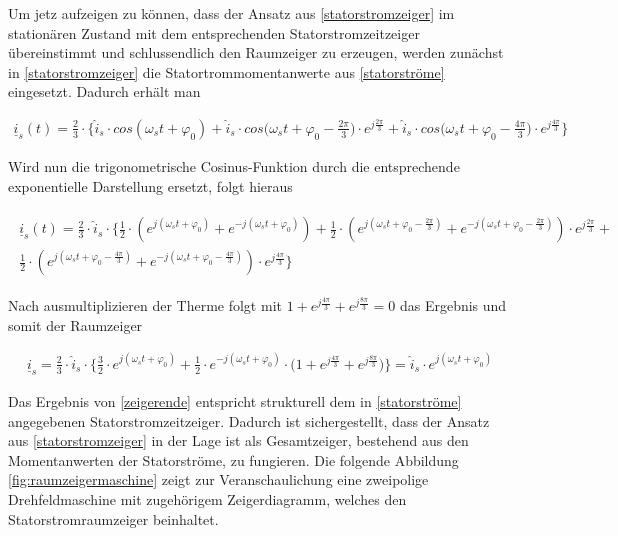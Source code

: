 Um jetz aufzeigen zu können, dass der Ansatz aus \ref{statorstromzeiger} im stationären Zustand mit dem entsprechenden Statorstromzeitzeiger übereinstimmt und schlussendlich den Raumzeiger zu erzeugen, werden zunächst in \ref{statorstromzeiger} die Statortrommomentanwerte aus \ref{statorströme} eingesetzt.
Dadurch erhält man

\begin{align}
\underline{i}_{s}(t) = \frac{2}{3} \cdot \biggl\{\hat{i}_{s}\cdot cos(\omega_{s}t+\varphi_{0}) + \hat{i}_{s}\cdot cos\bigg(\omega_{s}t+\varphi_{0}-\frac{2\pi}{3}\bigg)\cdot e^{j\tfrac{2\pi}{3}} + \hat{i}_{s}\cdot cos\bigg(\omega_{s}t+\varphi_{0}-\frac{4\pi}{3}\bigg)\cdot e^{j\tfrac{4\pi}{3}} \biggr\}
\label{zwischen1}
\end{align}

Wird nun die trigonometrische Cosinus-Funktion durch die entsprechende exponentielle Darstellung ersetzt, folgt hieraus

\begin{align}
	\begin{split}
	\underline{i}_{s}(t) = \frac{2}{3} \cdot \hat{i}_{s} \cdot \biggl\{ \frac{1}{2} \cdot ( e^{j(\omega_{s}t+\varphi_{0})} + e^{-j(\omega_{s}t+\varphi_{0})} ) + \frac{1}{2} \cdot ( e^{j(\omega_{s}t+\varphi_{0}-\frac{2\pi}{3})} + e^{-j(\omega_{s}t+\varphi_{0}-\frac{2\pi}{3})})\cdot e^{j\tfrac{2\pi}{3}} + \\ \frac{1}{2} \cdot ( e^{j(\omega_{s}t+\varphi_{0}-\frac{4\pi}{3})} + e^{-j(\omega_{s}t+\varphi_{0}-\frac{4\pi}{3})})\cdot e^{j\tfrac{4\pi}{3}}  \biggr\}
	\label{zwischen2}
	\end{split}
\end{align}

Nach ausmultiplizieren der Therme folgt mit $1+e^{j\tfrac{4\pi}{3}}+e^{j\tfrac{8\pi}{3}}=0$ das Ergebnis und somit der Raumzeiger

\begin{align}
	\underline{i}_{s} = \frac{2}{3} \cdot \hat{i}_{s}\cdot\biggl\{ \frac{3}{2} \cdot  e^{j(\omega_{s}t+\varphi_{0})} + \frac{1}{2} \cdot e^{-j(\omega_{s}t+\varphi_{0})} \cdot \bigg( 1+e^{j\tfrac{4\pi}{3}}+e^{j\tfrac{8\pi}{3}} \bigg)  \biggr\} = \hat{i}_{s} \cdot e^{j(\omega_{s}t+\varphi_{0})}
	\label{zeigerende}
\end{align}

Das Ergebnis von \ref{zeigerende} entspricht strukturell dem in \ref{statorströme} angegebenen Statorstromzeitzeiger. Dadurch ist sichergestellt, dass der Ansatz aus \ref{statorstromzeiger} in der Lage ist als Gesamtzeiger, bestehend aus den Momentanwerten der Statorströme, zu fungieren. 
Die folgende Abbildung \ref{fig:raumzeigermaschine} zeigt zur Veranschaulichung eine zweipolige Drehfeldmaschine mit zugehörigem Zeigerdiagramm, welches den Statorstromraumzeiger beinhaltet. 

